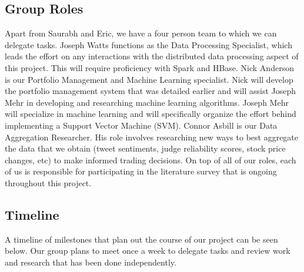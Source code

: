 \subsection{Group Roles}

Apart from Saurabh and Eric, we have a four person team to which we can delegate tasks. Joseph Watts functions as the Data Processing Specialist, which leads the effort on any interactions with the distributed data processing aspect of this project. This will require proficiency with Spark and HBase. Nick Anderson is our Portfolio Management and Machine Learning specialist. Nick will develop the portfolio management system that was detailed earlier and will assist Joseph Mehr in developing and researching machine learning algorithms. Joseph Mehr will specialize in machine learning and will specifically organize the effort behind implementing a Support Vector Machine (SVM). Connor Asbill is our Data Aggregation Researcher. His role involves researching new ways to best aggregate the data that we obtain (tweet sentiments, judge reliability scores, stock price changes, etc) to make informed trading decisions. On top of all of our roles, each of us is responsible for participating in the literature survey that is ongoing throughout this project.

\subsection{Timeline}

A timeline of milestones that plan out the course of our project can be seen below. Our group plans to meet once a week to delegate tasks and review work and research that has been done independently.

